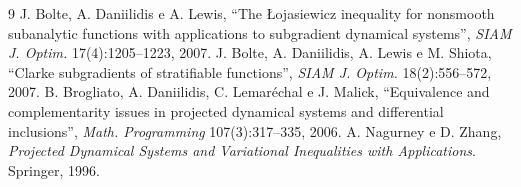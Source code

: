 \documentclass[11pt,a4paper]{article}
\begin{document}
\begin{thebibliography}{9}
 J. Bolte, A. Daniilidis e A. Lewis, ``The \L{}ojasiewicz inequality for nonsmooth subanalytic functions with applications to subgradient dynamical systems'', \emph{SIAM J. Optim.} 17(4):1205--1223, 2007.
 J. Bolte, A. Daniilidis, A. Lewis e M. Shiota, ``Clarke subgradients of stratifiable functions'', \emph{SIAM J. Optim.} 18(2):556--572, 2007.
 B. Brogliato, A. Daniilidis, C. Lemaréchal e J. Malick, ``Equivalence and complementarity issues in projected dynamical systems and differential inclusions'', \emph{Math. Programming} 107(3):317--335, 2006.
 A. Nagurney e D. Zhang, \emph{Projected Dynamical Systems and Variational Inequalities with Applications}. Springer, 1996.
\end{thebibliography}
\end{document}

